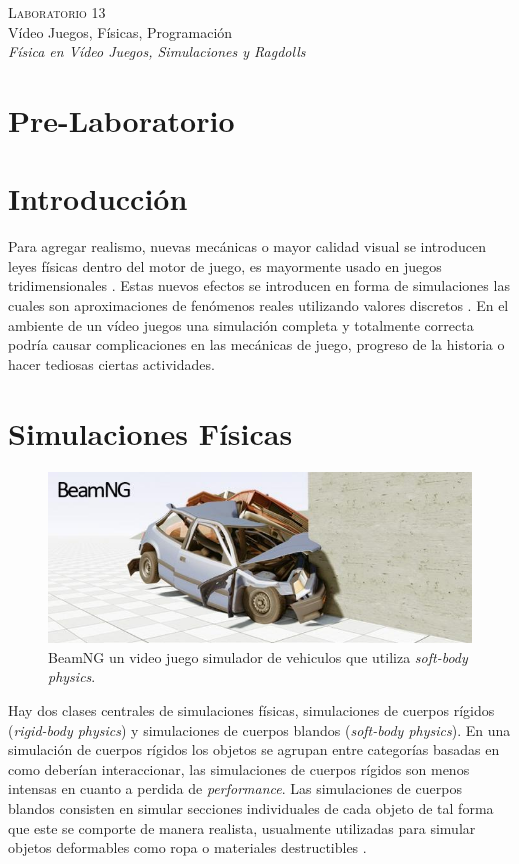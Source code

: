 \begin{center}
\textsc{\Large Laboratorio 13}~\\
{\large Vídeo Juegos, Físicas, Programación}~\\
\emph{Física en Vídeo Juegos, Simulaciones y Ragdolls}
\end{center}

\section{Pre-Laboratorio}

\section{Introducción}
Para agregar realismo, nuevas mecánicas o mayor calidad visual se introducen leyes físicas dentro del motor de juego, es mayormente usado en juegos tridimensionales \cite[p.~325]{jenkinscreatinggames}. Estas nuevos efectos se introducen en forma de simulaciones las cuales son aproximaciones de fenómenos reales utilizando valores discretos \cite{ian_gamephysics}. En el ambiente de un vídeo juegos una simulación completa y totalmente correcta podría causar complicaciones en las mecánicas de juego, progreso de la historia o hacer tediosas ciertas actividades.

\section{Simulaciones Físicas}
\setlength\intextsep{0pt}
\begin{figure}
\includegraphics[width=\linewidth]{semana13/beamng_gamephysics.jpg}
\caption{BeamNG un video juego simulador de vehiculos que utiliza \emph{soft-body physics}.}
\label{fig:beamng}
\end{figure}
Hay dos clases centrales de simulaciones físicas, simulaciones de cuerpos rígidos (\emph{rigid-body physics}) y simulaciones de cuerpos blandos (\emph{soft-body physics}). En una simulación de cuerpos rígidos los objetos se agrupan entre categorías basadas en como deberían interaccionar, las simulaciones de cuerpos rígidos son menos intensas en cuanto a perdida de \emph{performance}. Las simulaciones de cuerpos blandos consisten en simular secciones individuales de cada objeto de tal forma que este se comporte de manera realista, usualmente utilizadas para simular objetos deformables como ropa o materiales destructibles \cite{ian_gamephysics}.
